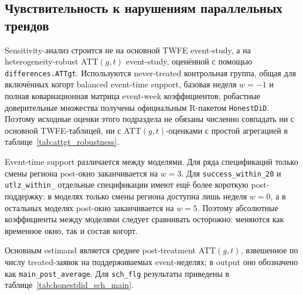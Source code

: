 \documentclass[14pt,a4paper]{extarticle}
\begin{document}
\subsection{Чувствительность к нарушениям параллельных трендов}
\label{subsec:honestdid_sensitivity}

Sensitivity-анализ строится не на основной TWFE event-study, а на heterogeneity-robust ATT\((g,t)\) event-study, оценённой с помощью \texttt{differences.ATTgt}. Используются never-treated контрольная группа, общая для включённых когорт balanced event-time support, базовая неделя \(w=-1\) и полная ковариационная матрица event-week коэффициентов; робастные доверительные множества получены официальным R-пакетом \texttt{HonestDiD}. Поэтому исходные оценки этого подраздела не обязаны численно совпадать ни с основной TWFE-таблицей, ни с ATT\((g,t)\)-оценками с простой агрегацией в таблице~\ref{tab:attgt_robustness}.

Event-time support различается между моделями. Для ряда спецификаций только смены региона post-окно заканчивается на \(w=3\). Для \texttt{success\_within\_20} и \texttt{utlz\_\allowbreak within\_} отдельные спецификации имеют ещё более короткую post-поддержку: в моделях только смены региона доступна лишь неделя \(w=0\), а в остальных моделях post-окно заканчивается на \(w=5\). Поэтому абсолютные коэффициенты между моделями следует сравнивать осторожно: меняются как временное окно, так и состав когорт.

Основным estimand является среднее post-treatment ATT\((g,t)\), взвешенное по числу treated-заявок на поддерживаемых event-неделях; в output оно обозначено как \texttt{main\_\allowbreak post\_\allowbreak average}. Для \texttt{sch\_flg} результаты приведены в таблице~\ref{tab:honestdid_sch_main}.
\end{document}
